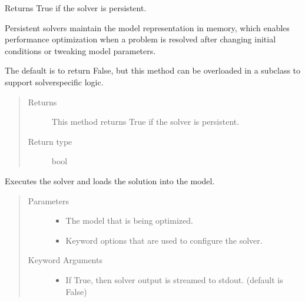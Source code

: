 \documentclass[letterpaper,10pt,english]{sphinxmanual}
\begin{document}
\begin{fulllineitems}
\begin{fulllineitems}
\label{\detokenize{reference/mpr:pao.mpr.solvers.mibs.LinearMultilevelSolver_MIBS.is_persistent}}
Returns True if the solver is persistent.

Persistent solvers maintain the model representation in memory,
which enables performance optimization when a problem is resolved
after changing initial conditions or tweaking model parameters.

The default is to return False, but this method can be overloaded
in a subclass to support solver\sphinxhyphen{}specific logic.
\begin{quote}\begin{description}
\item[{Returns}] \leavevmode
This method returns True if the solver is persistent.

\item[{Return type}] \leavevmode
bool

\end{description}\end{quote}

\end{fulllineitems}


\begin{fulllineitems}
\label{\detokenize{reference/mpr:pao.mpr.solvers.mibs.LinearMultilevelSolver_MIBS.solve}}
Executes the solver and loads the solution into the model.
\begin{quote}\begin{description}
\item[{Parameters}] \leavevmode\begin{itemize}
\item {} 
 \textendash{} The model that is being optimized.

\item {} 
 \textendash{} Keyword options that are used to configure the solver.

\end{itemize}

\item[{Keyword Arguments}] \leavevmode\begin{itemize}
\item {} 
 \textendash{} If True, then solver output is streamed to stdout. (default is False)


\end{itemize}
\end{description}
\end{quote}
\end{fulllineitems}
\end{fulllineitems}
\end{document}
